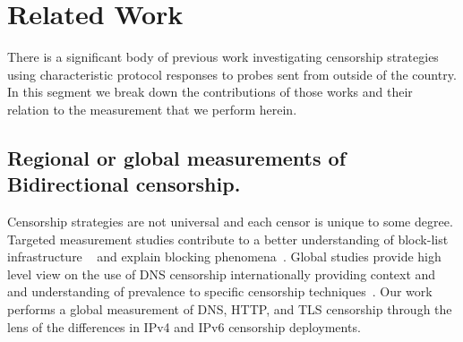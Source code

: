 \section{Related Work}\label{sec:related}

There is a significant body of previous work investigating censorship
strategies using characteristic protocol responses to probes sent from outside
of the country. In this segment we break down the contributions of those works
and their relation to the measurement that we perform herein.

\subsection{Regional or global measurements of Bidirectional censorship.}

Censorship strategies are not universal and each censor is unique to some
degree. Targeted measurement studies contribute to a better understanding of
block-list infrastructure ~\cite{ramesh2020decentralized, USESEC21:GFWatch} and
explain blocking phenomena~\cite{global2002great, Anonymous2020:TripletCensors}.
Global studies provide high level view on the use of DNS censorship
internationally providing context and and understanding of prevalence to
specific censorship techniques~\cite{vandersloot2018quack, scott2016satellite,
pearce2017global, sundara2020censored, niaki2020iclab}. Our work performs a
global measurement of DNS, HTTP, and TLS censorship through the lens
of the differences in IPv4 and IPv6 censorship deployments.




